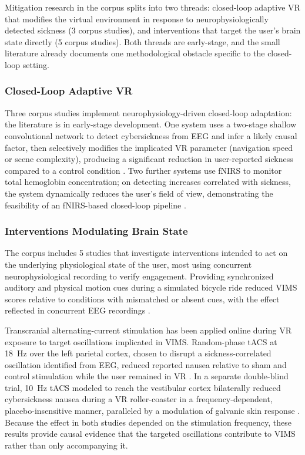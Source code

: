 Mitigation research in the corpus splits into two threads: closed-loop adaptive VR that modifies the virtual environment in response to neurophysiologically detected sickness (3 corpus studies), and interventions that target the user's brain state directly (5 corpus studies).
Both threads are early-stage, and the small literature already documents one methodological obstacle specific to the closed-loop setting.

\subsubsection{Closed-Loop Adaptive VR}
Three corpus studies implement neurophysiology-driven closed-loop adaptation: the literature is in early-stage development.
One system uses a two-stage shallow convolutional network to detect cybersickness from EEG and infer a likely causal factor, then selectively modifies the implicated VR parameter (navigation speed or scene complexity), producing a significant reduction in user-reported sickness compared to a control condition \cite{uyanCDMSRealtimeSystem2024}.
Two further systems use fNIRS to monitor total hemoglobin concentration; on detecting increases correlated with sickness, the system dynamically reduces the user's field of view, demonstrating the feasibility of an fNIRS-based closed-loop pipeline \cite{yamamuraHemodynamicVRAdaptingUsers2021, yamamuraPleasantLocomotionReducing2020}.

\subsubsection{Interventions Modulating Brain State}
The corpus includes 5 studies that investigate interventions intended to act on the underlying physiological state of the user, most using concurrent neurophysiological recording to verify engagement.
Providing synchronized auditory and physical motion cues during a simulated bicycle ride reduced VIMS scores relative to conditions with mismatched or absent cues, with the effect reflected in concurrent EEG recordings \cite{yeoEEGbasedAnalysisVarious2022}.

Transcranial alternating-current stimulation has been applied online during VR exposure to target oscillations implicated in VIMS.
Random-phase tACS at 18~Hz over the left parietal cortex, chosen to disrupt a sickness-correlated oscillation identified from EEG, reduced reported nausea relative to sham and control stimulation while the user remained in VR \cite{liReducedVRMotion2024}.
In a separate double-blind trial, 10~Hz tACS modeled to reach the vestibular cortex bilaterally reduced cybersickness nausea during a VR roller-coaster in a frequency-dependent, placebo-insensitive manner, paralleled by a modulation of galvanic skin response \cite{benelliFrequencyDependentReductionCybersickness2023}.
Because the effect in both studies depended on the stimulation frequency, these results provide causal evidence that the targeted oscillations contribute to VIMS rather than only accompanying it.

